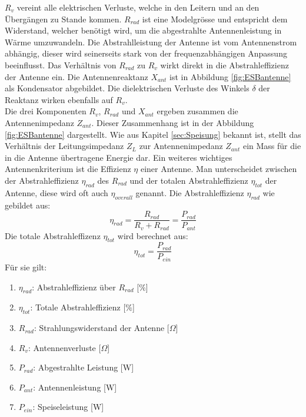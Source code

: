 \newpage
$R_{v}$ vereint alle elektrischen Verluste, welche in den Leitern und an den Übergängen zu Stande kommen. $R_{rad}$ ist eine Modelgrösse und entspricht dem Widerstand, welcher benötigt wird, um die abgestrahlte Antennenleistung in Wärme umzuwandeln. Die Abstrahlleistung der Antenne ist vom Antennenstrom abhängig, dieser wird seinerseits stark von der frequenzabhängigen Anpassung beeinflusst. Das Verhältnis von $R_{rad}$ zu $R_{v}$ wirkt direkt in die Abstrahleffizienz der Antenne ein. Die Antennenreaktanz $X_{ant}$ ist in Abbildung \ref{fig:ESBantenne} als Kondensator abgebildet. Die dielektrischen Verluste des Winkels $\delta$ der Reaktanz wirken ebenfalls auf $R_{v}$.\\
Die drei Komponenten $R_{v}$, $R_{rad}$ und $X_{ant}$ ergeben zusammen die Antennenimpedanz $Z_{ant}$. Dieser Zusammenhang ist in der Abbildung \ref{fig:ESBantenne} dargestellt. Wie aus Kapitel \ref{sec:Speisung} bekannt ist, stellt das Verhältnis der  Leitungsimpedanz $Z_L$ zur Antennenimpedanz $Z_{ant}$ ein Mass für die in die Antenne übertragene Energie dar. Ein weiteres wichtiges Antennenkriterium ist die Effizienz $\eta$ einer Antenne. Man unterscheidet zwischen der Abstrahleffizienz $\eta_{rad}$ des $R_{rad}$ und der totalen Abstrahleffizienz $\eta_{tot}$ der Antenne, diese wird oft auch $\eta_{overall}$ genannt. Die Abstrahleffizienz $\eta_{rad}$ wie gebildet aus:
\begin{equation}
\eta_{rad}=\dfrac{R_{rad}}{R_v + R_{rad}}=\dfrac{P_{rad}}{P_{ant}}
\label{eq:eta_rad}
\end{equation}
Die totale Abstrahleffizenz $\eta_{tot}$ wird berechnet aus:
\begin{equation}
\eta_{tot}=\dfrac{P_{rad}}{P_{ein}}
\label{eq:eta_tot}
\end{equation}
Für sie gilt:
\begin{enumerate}[leftmargin=2cm]
 \item[] $\eta_{rad}$: Abstrahleffizienz über $R_{rad}$ [$\%$] 
 \item[] $\eta_{tot}$: Totale Abstrahleffizienz [$\%$] 
 \item[] $R_{rad}$: Strahlungswiderstand der Antenne [$\Omega$] 
 \item[] $R_v$: Antennenverluste [$\Omega$] 
 \item[] $P_{rad}$: Abgestrahlte Leistung [W] 
 \item[] $P_{ant}$: Antennenleistung [W] 
 \item[] $P_{ein}$: Speiseleistung [W] 
\end{enumerate} 


